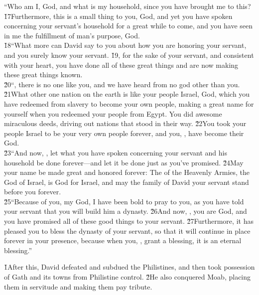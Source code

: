 \begin{poetry}
\poeml ``Who am I,  God, and what is my household, since you have brought me to this? \v{17}Furthermore, this is a small thing to you, God, and yet you have spoken concerning your servant's household for a great while to come, and you have seen in me the fulfillment of man's purpose,  God. \\
\poeml \v{18}``What more can David say to you about how you are honoring your servant, and you surely know your servant. \v{19}, for the sake of your servant, and consistent with your heart, you have done all of these great things and are now making these great things known. \\
\poeml \v{20}``, there is no one like you, and we have heard from no god other than you. \v{21}What other one nation on the earth is like your people Israel, God, which you have redeemed from slavery to become your own people, making a great name for yourself when you redeemed your people from Egypt. You did awesome miraculous deeds, driving out nations that stood in their way. \v{22}You took your people Israel to be your very own people forever, and you, , have become their God. \\
\poeml \v{23}``And now, , let what you have spoken concerning your servant and his household be done forever---and let it be done just as you've promised. \v{24}May your name be made great and honored forever: The  of the Heavenly Armies, the God of Israel, is God for Israel, and may the family of David your servant stand before you forever. \\
\poeml \v{25}``Because of you, my God, I have been bold to pray to you, as you have told your servant that you will build him a dynasty. \v{26}And now, , you are God, and you have promised all of these good things to your servant. \v{27}Furthermore, it has pleased you to bless the dynasty of your servant, so that it will continue in place forever in your presence, because when you, , grant a blessing, it is an eternal blessing.''
\end{poetry}

\v{1}After this, David defeated and subdued the Philistines, and then took possession of Gath and its towns from Philistine control. \v{2}He also conquered Moab, placing them in servitude and making them pay tribute.

